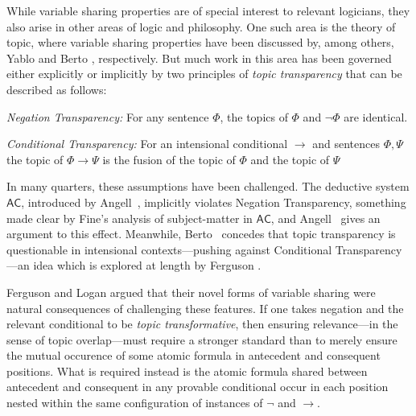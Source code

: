 \documentclass{amsart}
\theoremstyle{definition}
\begin{document}
While variable sharing properties are of special interest to relevant logicians, they also arise in other areas of logic and philosophy. One such area is the theory of topic, where variable sharing properties have been discussed by, among others, Yablo \citeyearpar{yablo2014} and Berto \citeyearpar{berto2022}, respectively. But much work in this area has been governed either explicitly or implicitly by two principles of \emph{topic transparency} that can be described as follows:


\vspace{.2cm}

\noindent\emph{Negation Transparency:} For any sentence $\Phi$, the topics of $\Phi$ and $\neg\Phi$ are identical.

\vspace{.2cm}

\noindent\emph{Conditional Transparency:} For an intensional conditional $\rightarrow$ and sentences $\Phi,\Psi$ the topic of $\Phi\rightarrow\Psi$ is the fusion of the topic of $\Phi$ and the topic of $\Psi$

\vspace{.2cm}

\noindent In many quarters, these assumptions have been challenged. The deductive system $\mathsf{AC}$, introduced by Angell~\citeyearpar{angell1977}, implicitly violates Negation Transparency, something made clear by Fine's \citeyearpar{fine2015} analysis of subject-matter in $\mathsf{AC}$, and Angell~\citeyearpar[121]{angell1989} gives an argument to this effect. Meanwhile, Berto~\citeyearpar{berto2022} concedes  that topic transparency is questionable in intensional contexts---pushing against Conditional Transparency---an idea which is explored at length by Ferguson \citeyearpar{ferguson2023a}.



Ferguson and Logan \citeyearpar{FergusonForthcoming-FERTTA-7} argued that their novel forms of variable sharing were natural consequences of challenging these features. If one takes negation and the relevant conditional to be \emph{topic transformative}, then ensuring relevance---in the sense of topic overlap---must require a stronger standard than to merely ensure the mutual occurence of some atomic formula in antecedent and consequent positions. What is required instead is the atomic formula shared between antecedent and consequent in any provable conditional occur in each position nested within the same configuration of instances of $\neg$ and $\rightarrow$.
\end{document}
